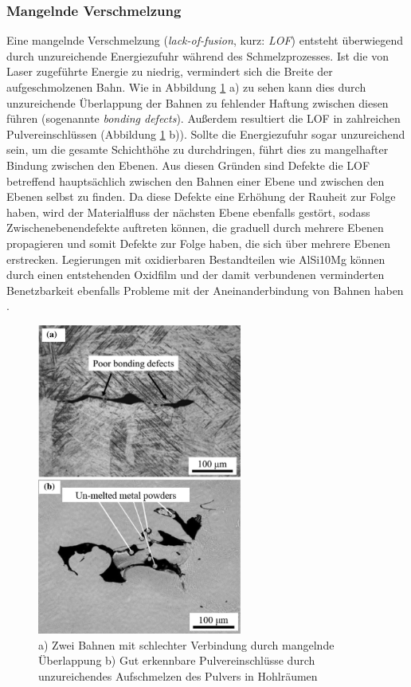 		\subsubsection{Mangelnde Verschmelzung}
		Eine mangelnde Verschmelzung (\emph{lack-of-fusion}, kurz: \emph{LOF}) entsteht
		überwiegend durch unzureichende Energiezufuhr während des Schmelzprozesses. Ist die von
		Laser zugeführte Energie zu niedrig, vermindert sich die Breite der aufgeschmolzenen Bahn.
		Wie in Abbildung \ref{fig:defects_lof} a) zu sehen kann dies durch unzureichende
		Überlappung der Bahnen zu fehlender Haftung zwischen diesen führen (sogenannte
		\emph{bonding defects}). Außerdem resultiert die LOF in zahlreichen Pulvereinschlüssen
		(Abbildung \ref{fig:defects_lof} b)). Sollte die Energiezufuhr sogar unzureichend sein,
		um die gesamte Schichthöhe zu durchdringen, führt dies zu mangelhafter Bindung zwischen
		den Ebenen. Aus diesen Gründen sind Defekte die LOF betreffend hauptsächlich zwischen
		den Bahnen einer Ebene und zwischen den Ebenen selbst zu finden. Da diese Defekte eine
		Erhöhung der Rauheit zur Folge haben, wird der Materialfluss der nächsten Ebene ebenfalls
		gestört, sodass Zwischenebenendefekte auftreten können, die graduell durch mehrere Ebenen
		propagieren und somit Defekte zur Folge haben, die sich über mehrere Ebenen erstrecken.
		Legierungen mit oxidierbaren Bestandteilen wie AlSi10Mg können durch einen entstehenden
		Oxidfilm und der damit verbundenen verminderten Benetzbarkeit ebenfalls Probleme mit der
		Aneinanderbindung von Bahnen haben \cite{zhang2017defect}.

		\begin{figure}[!ht]
			\centering
			\includegraphics[width=0.6\textwidth]{chapter/main/img/defects/lack_of_fusion.png}
			\caption{a) Zwei Bahnen mit schlechter Verbindung durch mangelnde Überlappung
			b) Gut erkennbare Pulvereinschlüsse durch unzureichendes Aufschmelzen des Pulvers
			in Hohlräumen \cite{zhang2017defect}}
			\label{fig:defects_lof}
		\end{figure}

